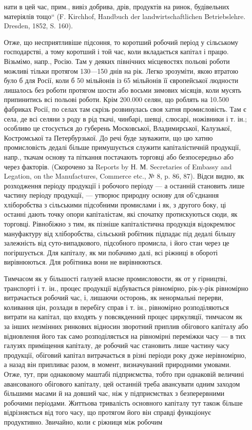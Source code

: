 нати в цей час, прим., вивіз добрива, дрів, продуктів на ринок, будівельних
матеріялів тощо“ (F. Kirchhof, Handbuch der landwirtschaftlichen
Betriebslehre. Dresden, 1852, S. 160).

Отже, що несприятливіше підсоння, то коротший робочий період у
сільському господарстві, а тому коротший і той час, коли вкладається
капітал і працю. Візьмімо, напр., Росію. Там у деяких північних місцевостях
польові роботи можливі тільки протягом 130—150 днів на рік.
Легко зрозуміти, якою втратою було б для Росії, коли б 50 мільйонів
із 65 мільйонів її європейської людности лишалось без роботи протягом
шости або восьми зимових місяців, коли мусять припинитись всі польові
роботи. Крім 200.000 селян, що роблять на 10.500 фабриках Росії, по
селах там скрізь розвинулась своя хатня промисловість. Там є села, де
всі селяни з роду в рід ткачі, чинбарі, шевці, слюсарі, ножівники і т.
ін.; особливо це стосується до губерень Московської, Владимирської, Калузької,
Костромської та Петербурзької. До речі буде зауважити, що цю
хатню промисловість дедалі більше примушується служити капіталістичній
продукції, напр., ткачам основу та піткання постачають торговці або
безпосередньо або через факторів. (Скорочено за Reports by Н. М. Secretaries
of Embassy and Legation, on the Manufactures, Commerce etc.,
№ 8, p. 86, 87). Відси видно, як розходження періоду продукції і робочого
періоду — а останній становить лише частину періоду продукції, —
утворює природну основу для об’єднання хліборобства з сільськими підсобними
промислами і як, з другого боку, ці останні дають точку опори
капіталістам, які спочатку протискуються сюди, як торговці. Рівнобіжно
з тим, як пізніше капіталістична продукція відокремлює мануфактуру від
хліборобства, сільський робітник підпадає під дедалі більшу залежність
від суто-випадкового, підсобного промисла, і його стан через це погіршується.
Для капіталу, як ми побачимо далі, всі ріжниці в обороті вирівнюються.
Для робітника вони не вирівнюються.

Тимчасом як у більшості галузей власне промисловости, як от у гірництві,
транспорті і т. ін., процес продукції відбувається рівномірно, рік-у-рік
рівномірно витрачається робочий час, і, лишаючи осторонь, як ненормальні
перерви, коливання цін, розлади в перебігу справ і т. ін., рівномірно
розподіляються витрати на капітал, що входять у повсякденний процес
циркуляції, тимчасом як за інших незмінних ринкових відносин
зворотний приплив обігового капіталу або відновлення його так само
розподіляється на рівномірні переміжки часу — в тих галузях приміщення
капіталу, де робочий час становить лише частину часу продукції, обіговий
капітал витрачається в різні періоди року дуже нерівномірно, а назад
він припливає разом, в момент, визначуваний природними умовами. Отже,
тут, при однаковому маштабі підприємства, тобто при однаковій величині
авансованого обігового капіталу, цей останній треба авансувати одним
заходом більшими масами й на довший час, ніж у підприємствах з безперервними
робочими періодами. Життьова тривалість основного капіталу
тут також більше відрізняється від того часу, що протягом його він
справді функціонує продуктивно. Звичайно, коли є ріжниця між робочим
